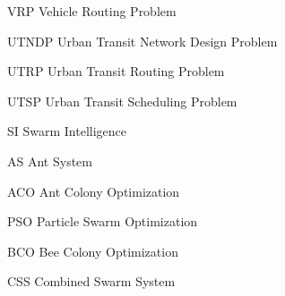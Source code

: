 \begin{abbrv}
\item[VRP] Vehicle Routing Problem
\item[UTNDP] Urban Transit Network Design Problem
\item[UTRP] Urban Transit Routing Problem
\item[UTSP] Urban Transit Scheduling Problem
\item[SI] Swarm Intelligence
\item[AS] Ant System
\item[ACO] Ant Colony Optimization
\item[PSO] Particle Swarm Optimization
\item[BCO] Bee Colony Optimization
\item[CSS] Combined Swarm System
\end{abbrv}
 
 

 
 
 
 
